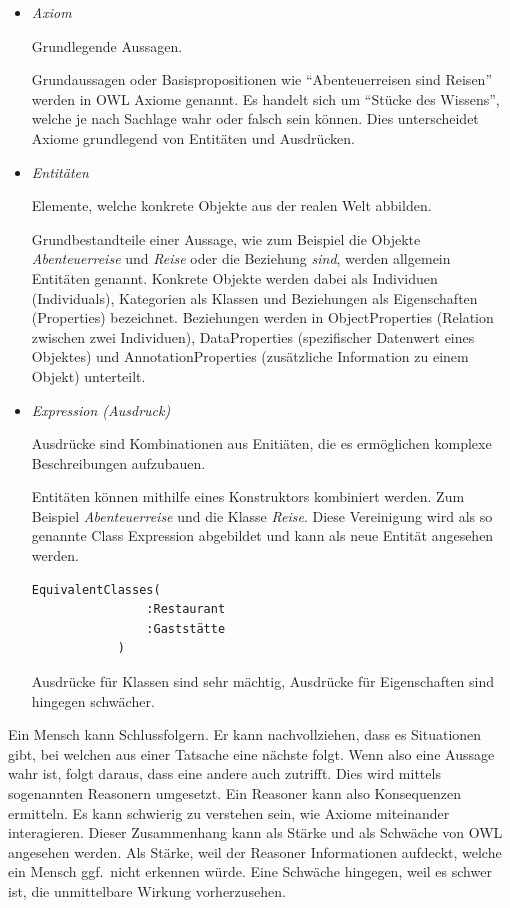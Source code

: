 \begin{itemize}
	\item \textit{Axiom}

        Grundlegende Aussagen.

        Grundaussagen  oder Basispropositionen wie ``Abenteuerreisen sind Reisen'' werden in OWL Axiome genannt. Es handelt sich  um ``Stücke des Wissens'', welche je nach Sachlage wahr oder falsch sein können. Dies unterscheidet Axiome grundlegend von Entitäten und Ausdrücken.

    \item \textit{Entitäten}

        Elemente, welche konkrete Objekte aus der realen Welt abbilden.

        Grundbestandteile einer Aussage, wie zum Beispiel die Objekte \textit{Abenteuerreise} und \textit{Reise} oder die Beziehung \textit{sind}, werden allgemein Entitäten genannt. Konkrete Objekte werden dabei als Individuen (Individuals), Kategorien als Klassen und Beziehungen als Eigenschaften (Properties) bezeichnet. Beziehungen werden in ObjectProperties (Relation zwischen zwei Individuen), DataProperties (spezifischer Datenwert eines Objektes) und AnnotationProperties (zusätzliche Information zu einem Objekt) unterteilt.

	\item \textit{Expression (Ausdruck)}

        Ausdrücke sind Kombinationen aus Enitiäten, die es ermöglichen komplexe Beschreibungen aufzubauen.

        Entitäten können mithilfe eines Konstruktors kombiniert werden. Zum Beispiel \textit{Abenteuerreise} und die Klasse \textit{Reise}. Diese Vereinigung wird als so genannte Class Expression abgebildet und kann als neue Entität angesehen werden.

        \begin{lstlisting}[caption={Beispiel eines Ausdrucks}]
            EquivalentClasses(
                :Restaurant
                :Gaststätte
            )
        \end{lstlisting}

        Ausdrücke für Klassen sind sehr mächtig, Ausdrücke für Eigenschaften sind hingegen schwächer.
\end{itemize}

Ein Mensch kann Schlussfolgern. Er kann nachvollziehen, dass es Situationen gibt, bei welchen aus einer Tatsache eine nächste folgt. Wenn also eine Aussage wahr ist, folgt daraus, dass eine andere auch zutrifft. Dies wird mittels sogenannten Reasonern umgesetzt. Ein Reasoner kann also Konsequenzen ermitteln. Es kann schwierig zu verstehen sein, wie Axiome miteinander interagieren. Dieser Zusammenhang kann als Stärke und als Schwäche von OWL angesehen werden. Als Stärke, weil der Reasoner Informationen aufdeckt, welche ein Mensch ggf.\ nicht erkennen würde. Eine Schwäche hingegen, weil es schwer ist, die unmittelbare Wirkung vorherzusehen.

